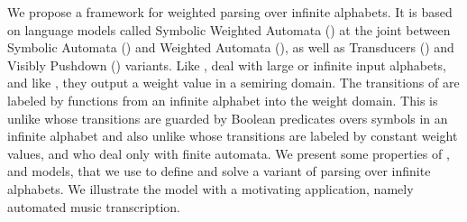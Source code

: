 %
%
We propose a framework for weighted parsing over infinite alphabets.
%
It is based on language models called Symbolic Weighted Automata (\SWA)
at the joint %
between Symbolic Automata (\SA) and Weighted Automata (\WA),
as well as Transducers (\SWT) and Visibly Pushdown (\SWVPA) variants.
%
Like \SA, \SWA deal with large or infinite input alphabets,
and like \WA, they output a weight value in a semiring domain.
The transitions of \SWA are labeled by functions from an infinite alphabet into the weight domain.
This is unlike \SA whose transitions are guarded by Boolean predicates
overs symbols in an infinite alphabet
and also unlike \WA whose transitions are labeled by constant weight values,
and who deal only with finite automata.
%
We present some properties of \SWA, \SWT and \SWVPA models,
that we use to define and solve a variant of parsing
over infinite alphabets.
%
We illustrate the model with a motivating application, namely
automated music transcription.

